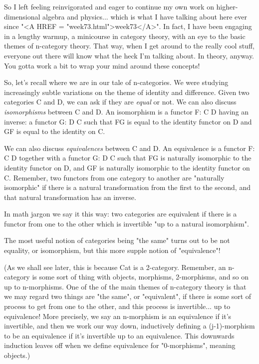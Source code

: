 So I left feeling reinvigorated and eager to continue my own work on
higher-dimensional algebra and physics... which is what I have talking
about here ever since "<A HREF = "week73.html">week73</A>".  
In fact, I have been engaging in a
lengthy warmup, a minicourse in category theory, with an eye to the
basic themes of n-category theory.  That way, when I get around to the
really cool stuff, everyone out there will know what the heck I'm talking
about.  In theory, anyway.  You gotta work a bit to wrap your mind
around these concepts!

So, let's recall where we are in our tale of n-categories.  We were
studying increasingly subtle variations on the theme of identity and
difference.  Given two categories C and D, we can ask if they are
\emph{equal} or not.  We can also discuss \emph{isomorphisms} between C and D.  An
isomorphism is a functor F: C \to  D having an inverse: a functor G: D \to 
C such that FG is equal to the identity functor on D and GF is equal to the
identity on C. 

We can also discuss \emph{equivalences} between C and D.  An equivalence is a
functor F: C \to  D together with a functor G: D \to  C such that FG
is naturally isomorphic to the identity functor on D, and GF is
naturally isomorphic to the identity functor on C.  Remember, two
functors from one category to another are "naturally
isomorphic" if there is a natural transformation from the first to
the second, and that natural transformation has an inverse.

In math jargon we say it this way: two categories are equivalent if
there is a functor from one to the other which is invertible "up to a
natural isomorphism".  

The most useful notion of categories being "the same" turns
out to be not equality, or isomorphism, but this more supple notion of
"equivalence"!

(As we shall see later, this is because Cat is a 2-category.  Remember,
an n-category is some sort of thing with objects, morphisms,
2-morphisms, and so on up to n-morphisms.  One of the of the main themes
of n-category theory is that we may regard two things are "the
same", or "equivalent", if there is some sort of process
to get from one to the other, and this process is invertible... up to
equivalence!  More precisely, we say an n-morphism is an equivalence if
it's invertible, and then we work our way down, inductively defining a
(j-1)-morphism to be an equivalence if it's invertible up to an
equivalence.  This downwards induction leaves off when we define
equivalence for "0-morphisms", meaning objects.)

